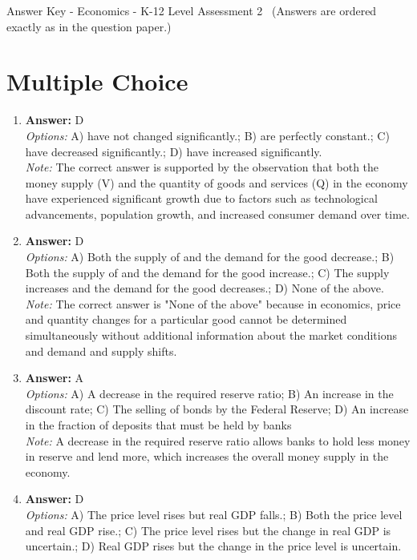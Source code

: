 \documentclass[12pt]{article}
\begin{document}
\begin{center}
Answer Key - Economics - K-12 Level Assessment 2 \
\small (Answers are ordered exactly as in the question paper.)
\end{center}

\section*{Multiple Choice}
\begin{enumerate}[label=\arabic*.]
\item \textbf{Answer:} D
\\ \textit{Options:} A) have not changed significantly.; B) are perfectly constant.; C) have decreased significantly.; D) have increased significantly.
\\ \textit{Note:} The correct answer is supported by the observation that both the money supply (V) and the quantity of goods and services (Q) in the economy have experienced significant growth due to factors such as technological advancements, population growth, and increased consumer demand over time.
\item \textbf{Answer:} D
\\ \textit{Options:} A) Both the supply of and the demand for the good decrease.; B) Both the supply of and the demand for the good increase.; C) The supply increases and the demand for the good decreases.; D) None of the above.
\\ \textit{Note:} The correct answer is "None of the above" because in economics, price and quantity changes for a particular good cannot be determined simultaneously without additional information about the market conditions and demand and supply shifts.
\item \textbf{Answer:} A
\\ \textit{Options:} A) A decrease in the required reserve ratio; B) An increase in the discount rate; C) The selling of bonds by the Federal Reserve; D) An increase in the fraction of deposits that must be held by banks
\\ \textit{Note:} A decrease in the required reserve ratio allows banks to hold less money in reserve and lend more, which increases the overall money supply in the economy.
\item \textbf{Answer:} D
\\ \textit{Options:} A) The price level rises but real GDP falls.; B) Both the price level and real GDP rise.; C) The price level rises but the change in real GDP is uncertain.; D) Real GDP rises but the change in the price level is uncertain.

\end{enumerate}
\end{document}
